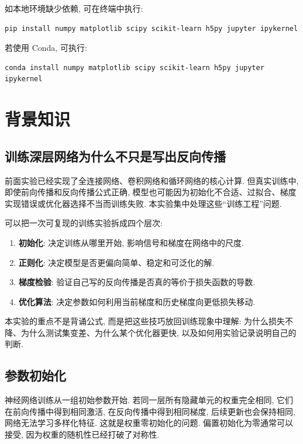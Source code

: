 \documentclass{../../nndlcourse}
\begin{document}
如本地环境缺少依赖, 可在终端中执行:
\begin{verbatim}
pip install numpy matplotlib scipy scikit-learn h5py jupyter ipykernel
\end{verbatim}
若使用 Conda, 可执行:
\begin{verbatim}
conda install numpy matplotlib scipy scikit-learn h5py jupyter ipykernel
\end{verbatim}


\section{背景知识}

\subsection{训练深层网络为什么不只是写出反向传播}

前面实验已经实现了全连接网络、卷积网络和循环网络的核心计算. 但真实训练中, 即使前向传播和反向传播公式正确, 模型也可能因为初始化不合适、过拟合、梯度实现错误或优化器选择不当而训练失败. 本实验集中处理这些``训练工程''问题.

可以把一次可复现的训练实验拆成四个层次:
\begin{enumerate}
    \item \textbf{初始化}: 决定训练从哪里开始, 影响信号和梯度在网络中的尺度.
    \item \textbf{正则化}: 决定模型是否更偏向简单、稳定和可泛化的解.
    \item \textbf{梯度检验}: 验证自己写的反向传播是否真的等价于损失函数的导数.
    \item \textbf{优化算法}: 决定参数如何利用当前梯度和历史梯度向更低损失移动.
\end{enumerate}
本实验的重点不是背诵公式, 而是把这些技巧放回训练现象中理解: 为什么损失不降、为什么测试集变差、为什么某个优化器更快, 以及如何用实验记录说明自己的判断.

\subsection{参数初始化}

神经网络训练从一组初始参数开始. 若同一层所有隐藏单元的权重完全相同, 它们在前向传播中得到相同激活, 在反向传播中得到相同梯度, 后续更新也会保持相同, 网络无法学习多样化特征. 这就是权重零初始化的问题. 偏置初始化为零通常可以接受, 因为权重的随机性已经打破了对称性.
\end{document}

